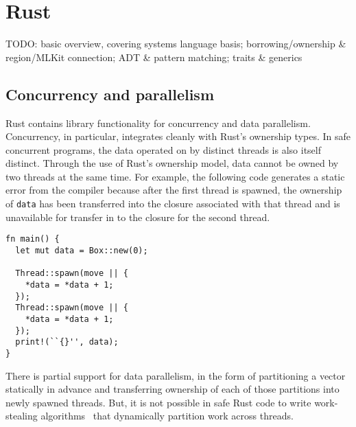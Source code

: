 
\section{Rust}
\label{sec:rust}

TODO: basic overview, covering systems language basis; borrowing/ownership \& region/MLKit connection; ADT \& pattern matching; traits \& generics


\subsection{Concurrency and parallelism}

Rust contains library functionality for concurrency and data parallelism.
Concurrency, in particular, integrates cleanly with Rust's ownership types.
In safe concurrent programs, the data operated on by distinct threads is also itself distinct.
Through the use of Rust's ownership model, data cannot be owned by two threads at the same time.
For example, the following code generates a static error from the compiler because after the first
thread is spawned, the ownership of \lstinline{data} has been transferred into the closure associated
with that thread and is unavailable for transfer in to the closure for the second thread.
\begin{lstlisting}
fn main() {
  let mut data = Box::new(0);

  Thread::spawn(move || {
    *data = *data + 1;
  });
  Thread::spawn(move || {
    *data = *data + 1;
  });
  print!(``{}'', data);
}
\end{lstlisting}

There is partial support for data parallelism, in the form of partitioning a vector statically in advance
and transferring ownership of each of those partitions into newly spawned threads.
But, it is not possible in safe Rust code to write work-stealing algorithms~\cite{blumeofe:multiprogrammed-work-stealing}
that dynamically partition work across threads.


